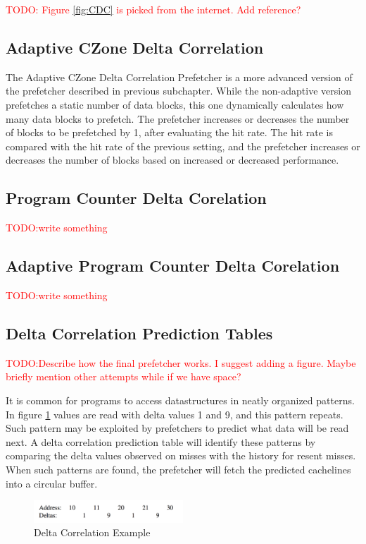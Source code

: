 \documentclass[a4paper]{IEEEtran}
\newcommand\TODO[1]{\textcolor{red}{TODO:#1}}
\newcommand\todo[1]{\TODO{#1}}
\begin{document}
\todo{ Figure \ref{fig:CDC} is picked from the internet. Add reference? }

\subsection{Adaptive CZone Delta Correlation}
The Adaptive CZone Delta Correlation Prefetcher is a more advanced version of the prefetcher described in previous subchapter.
While the non-adaptive version prefetches a static number of data blocks, this one dynamically calculates how many data blocks to prefetch.
The prefetcher increases or decreases the number of blocks to be prefetched by 1, after evaluating the hit rate.
The hit rate is compared with the hit rate of the previous setting, and the prefetcher increases or decreases the number of blocks based on increased or decreased performance. 

\subsection{Program Counter Delta Corelation}
\todo{write something}

\subsection{Adaptive Program Counter Delta Corelation}
\todo{write something}

\subsection{Delta Correlation Prediction Tables}

\todo{Describe how the final prefetcher works. I suggest adding a figure. Maybe briefly mention other attempts while if we have space?}

It is common for programs to access datastructures in neatly organized patterns.
In figure \ref{fig:DCExample} values are read with delta values 1 and 9, and this pattern repeats.
Such pattern may be exploited by prefetchers to predict what data will be read next.
A delta correlation prediction table will identify these patterns by comparing the delta values observed on misses with the history for resent misses.
When such patterns are found, the prefetcher will fetch the predicted cachelines into a circular buffer.


\begin{figure}[h!]
  \centering
      \includegraphics[width=0.5\textwidth]{Figures/DCExample}
  \caption{Delta Correlation Example}
  \label{fig:DCExample}
\end{figure}
\end{document}
